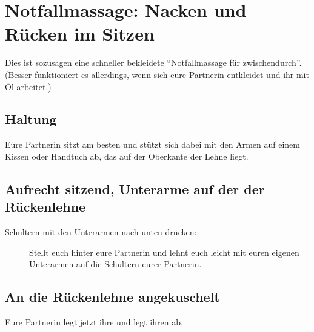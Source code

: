 \section{Notfallmassage: Nacken und Rücken im Sitzen}

Dies ist sozusagen eine schneller bekleidete "`Notfallmassage für zwischendurch"'. (Besser funktioniert es allerdings, wenn sich eure Partnerin entkleidet und ihr mit Öl arbeitet.)

\subsection{Haltung}

Eure Partnerin sitzt am besten  und stützt sich dabei mit den Armen auf einem Kissen oder Handtuch ab, das auf der Oberkante der Lehne liegt.

\subsection{Aufrecht sitzend, Unterarme auf der der Rückenlehne}

\begin{description}
  \item [Schultern mit den Unterarmen nach unten drücken:] Stellt euch hinter eure Partnerin und lehnt euch leicht mit euren eigenen Unterarmen auf die Schultern eurer Partnerin.
\end{description}

\subsection{An die Rückenlehne angekuschelt}

Eure Partnerin legt jetzt ihre  und legt ihren  ab.

